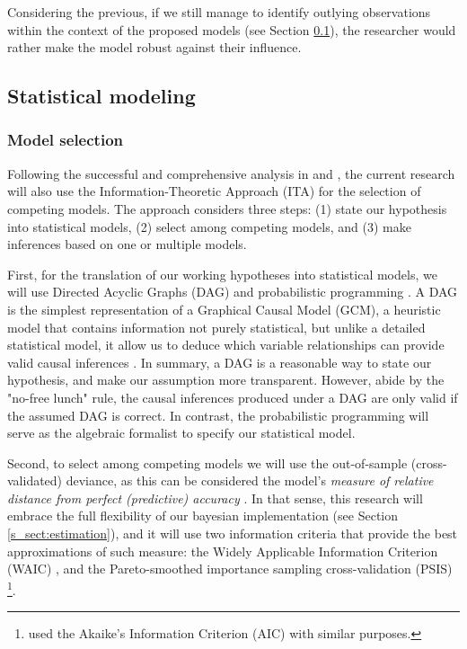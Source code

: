 Considering the previous, if we still manage to identify outlying observations within the context of the proposed models (see Section \ref{s_sect:models}), the researcher would rather make the model robust against their influence.
%
%
\subsection{Statistical modeling} \label{s_sect:models}
%
\subsubsection{Model selection}
%
Following the successful and comprehensive analysis in \citet{vanDaal_2020} and \citet{Lesterhuis_2018}, the current research will also use the Information-Theoretic Approach (ITA) \citep{Anderson_2008, Chamberlain_1965} for the selection of competing models. The approach considers three steps: (1) state our hypothesis into statistical models, (2) select among competing models, and (3) make inferences based on one or multiple models.

First, for the translation of our working hypotheses into statistical models, we will use Directed Acyclic Graphs (DAG) and probabilistic programming \citep{Jaynes_2003}. A DAG is the simplest representation of a Graphical Causal Model (GCM), a heuristic model that contains information not purely statistical, but unlike a detailed statistical model, it allow us to deduce which variable relationships can provide valid causal inferences \citep{Hernan_et_al_2020, McElreath_2020}. In summary, a DAG is a reasonable way to state our hypothesis, and make our assumption more transparent. However, abide by the "no-free lunch" rule, the causal inferences produced under a DAG are only valid if the assumed DAG is correct. In contrast, the probabilistic programming will serve as the algebraic formalist to specify our statistical model.

Second, to select among competing models we will use the out-of-sample (cross-validated) deviance, as this can be considered the model's \textit{measure of relative distance from perfect (predictive) accuracy} \citep{McElreath_2020}. In that sense, this research will embrace the full flexibility of our bayesian implementation (see Section \ref{s_sect:estimation}), and it will use two information criteria that provide the best approximations of such measure: the Widely Applicable Information Criterion (WAIC) \citep{Watanabe_2013}, and the Pareto-smoothed importance sampling cross-validation (PSIS) \citep{Vehtari_et_al_2021} \footnote{\citet{vanDaal_2020} used the Akaike’s Information Criterion (AIC) \citep{Akaike_1974} with similar purposes.}. 

